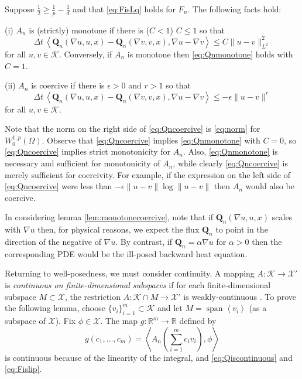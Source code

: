 \documentclass[final,leqno,onefignum,onetabnum]{siamltex1213bueler}
\newcommand\bQ{\mathbf{Q}}
\newcommand\eps{\epsilon}
\renewcommand{\grad}{\nabla}
\newcommand{\ip}[2]{\ensuremath{\left<#1,#2\right>}}
\newcommand\RR{\mathbb{R}}
\begin{document}
\begin{lemma}  \label{lem:monotonecoercive}  Suppose $\frac{1}{2} \ge \frac{1}{p} - \frac{1}{d}$ and that \eqref{eq:FisLq} holds for $F_n$.  The following facts hold:

(i)  $A_n$ is (strictly) monotone if there is ($C<1$) $C\le 1$ so that
\begin{equation}
\Delta t\,\ip{\bQ_n(\grad u,u,x) - \bQ_n(\grad v,v,x)}{\grad u - \grad v} \le C \|u-v\|_{L^2}^2 \label{eq:Qnmonotone}
\end{equation}
for all $u,v \in \mathcal{K}$.  Conversely, if $A_n$ is monotone then \eqref{eq:Qnmonotone} holds with $C=1$.

(ii)  $A_n$ is coercive if there is $\eps>0$ and $r>1$ so that
\begin{equation}
\Delta t\,\ip{\bQ_n(\grad u,u,x) - \bQ_n(\grad v,v,x)}{\grad u - \grad v} \le -\eps \|u-v\|^r \label{eq:Qncoercive}
\end{equation}
for all $u,v \in \mathcal{K}$.
\end{lemma}

Note that the norm on the right side of \eqref{eq:Qncoercive} is \eqref{eq:norm} for $W_0^{1,p}(\Omega)$.  Observe that \eqref{eq:Qncoercive} implies \eqref{eq:Qnmonotone} with $C=0$, so \eqref{eq:Qncoercive} implies strict monotonicity for $A_n$.  Also, \eqref{eq:Qnmonotone} is necessary and sufficient for monotonicity of $A_n$, while clearly \eqref{eq:Qncoercive} is merely sufficient for coercivity.  For example, if the expression on the left side of \eqref{eq:Qncoercive} were less than $-\eps \|u-v\| \log \|u-v\|$ then $A_n$ would also be coercive.

In considering lemma \eqref{lem:monotonecoercive}, note that if $\bQ_n(\grad u,u,x)$ scales with $\grad u$ then, for physical reasons, we expect the flux $\bQ_n$ to point in the direction of the negative of $\grad u$.  By contrast, if $\bQ_n = \alpha \grad u$ for $\alpha>0$ then the corresponding PDE would be the ill-posed backward heat equation.

Returning to well-posedness, we must consider continuity.  A mapping $A : \mathcal{K} \to \mathcal{X}'$ is \emph{continuous on finite-dimensional subspaces} if for each finite-dimensional subspace $M\subset \mathcal{X}$, the restriction $A : \mathcal{K}\cap M \to \mathcal{X}'$ is weakly-continuous \cite{KinderlehrerStampacchia}.  To prove the following lemma, choose $\{v_i\}_{i=1}^m \subset \mathcal{K}$ and let $M=\operatorname{span}\left<v_i\right>$ (as a subspace of $\mathcal{X}$).  Fix $\phi\in\mathcal{X}$.  The map $g:\RR^m \to \RR$ defined by
\begin{equation}
  g(c_1,\dots,c_m) = \ip{A_n\left(\sum_{i=1}^m c_i v_i\right)}{\phi}
\end{equation}
is continuous because of the linearity of the integral, and \eqref{eq:Qiscontinuous} and \eqref{eq:Fislip}.
\end{document}
